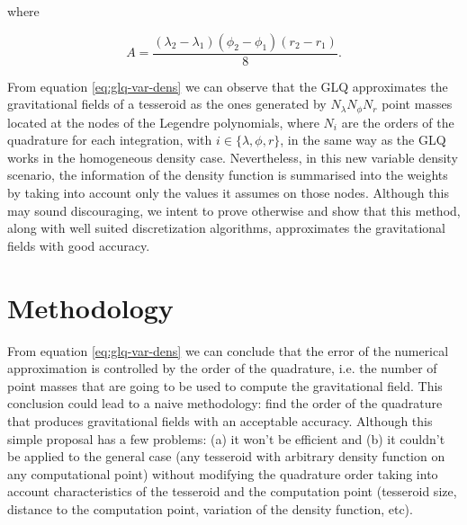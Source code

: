 \documentclass[extra]{gji}
\begin{document}

\noindent where

\begin{equation}
    A = 
    \frac{(\lambda_2 - \lambda_1)(\phi_2 - \phi_1)(r_2 - r_1)}{8}.
\end{equation}

From equation \ref{eq:glq-var-dens} we can observe that the GLQ 
approximates the gravitational fields of a tesseroid as the ones 
generated by $N_\lambda N_\phi N_r$ point masses located at the nodes 
of the Legendre polynomials, where $N_i$ are the orders of the 
quadrature for each integration, with $i \in \{ \lambda, \phi, r \}$, 
in the same way as the GLQ works in the homogeneous density case.
Nevertheless, in this new variable density scenario, the information of 
the density function is summarised into the weights by taking into 
account only the values it assumes on those nodes.
Although this may sound discouraging, we intent to prove otherwise and 
show that this method, along with well suited discretization 
algorithms, approximates the gravitational fields with good accuracy.


\section{Methodology}

From equation \ref{eq:glq-var-dens} we can conclude that the error of 
the numerical approximation is controlled by the order of the 
quadrature, i.e. the number of point masses that are going to be used 
to compute the gravitational field.
This conclusion could lead to a naive methodology: find the order of 
the quadrature that produces gravitational fields with an acceptable 
accuracy.
Although this simple proposal has a few problems: (a) it won't be 
efficient and (b) it couldn't be applied to the general case (any
tesseroid with arbitrary density function on any computational point) 
without modifying the quadrature order taking into account 
characteristics of the tesseroid and the computation point (tesseroid 
size, distance to the computation point, variation of the density 
function, etc).
\end{document}
